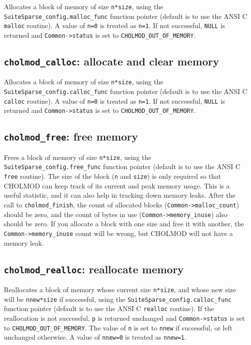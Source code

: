 \documentclass[11pt]{article}
\begin{document}

Allocates a block of memory of size {\tt n*size},
using the {\tt SuiteSparse\_config.malloc\_func}
function pointer (default is to use the ANSI C {\tt malloc} routine).
A value of {\tt n=0} is treated as {\tt n=1}.
If not successful, {\tt NULL} is returned and {\tt Common->status} is set to {\tt CHOLMOD\_OUT\_OF\_MEMORY}.

\subsection{{\tt cholmod\_calloc}: allocate and clear memory}


Allocates a block of memory of size {\tt n*size},
using the {\tt SuiteSparse\_config.calloc\_func}
function pointer (default is to use the ANSI C {\tt calloc} routine).
A value of {\tt n=0} is treated as {\tt n=1}.
If not successful, {\tt NULL} is returned and {\tt Common->status} is set to {\tt CHOLMOD\_OUT\_OF\_MEMORY}.

\newpage \subsection{{\tt cholmod\_free}: free memory}


Frees a block of memory of size {\tt n*size},
using the {\tt SuiteSparse\_config.free\_func}
function pointer (default is to use the ANSI C {\tt free} routine).
The size of the block ({\tt n} and {\tt size}) is only required so that CHOLMOD
can keep track of its current and peak memory usage.  This is a useful statistic,
and it can also help in tracking down memory leaks.  After the call to
{\tt cholmod\_finish}, the count of allocated blocks ({\tt Common->malloc\_count})
should be zero, and the count of bytes in use ({\tt Common->memory\_inuse}) also
should be zero.  If you allocate a block with one size and free it with another,
the {\tt Common->memory\_inuse} count will be wrong, but CHOLMOD will not
have a memory leak.

\subsection{{\tt cholmod\_realloc}: reallocate memory}


Reallocates a block of memory whose current size {\tt n*size},
and whose new size will be {\tt nnew*size} if successful,
using the {\tt SuiteSparse\_config.calloc\_func}
function pointer (default is to use the ANSI C {\tt realloc} routine).
If the reallocation is not successful, {\tt p} is returned unchanged
and {\tt Common->status} is set to {\tt CHOLMOD\_OUT\_OF\_MEMORY}.
The value of {\tt n} is set to {\tt nnew} if successful, or left
unchanged otherwise.
A value of {\tt nnew=0} is treated as {\tt nnew=1}.
\end{document}
